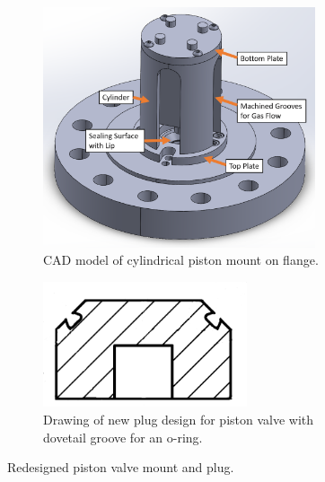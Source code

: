 \begin{figure}[tb]
    \centering
    \begin{subfigure}[t]{0.45\textwidth}
        \centering
        \includegraphics[width=0.88\textwidth]{design/photos/piston_mount_gen2_cad_labels.png}
        \caption{CAD model of cylindrical piston mount on flange.}
        \label{fig:cad mount 2}
    \end{subfigure}
    \hfill
    \begin{subfigure}[t]{0.45\textwidth}
        \centering
        \includegraphics[width=0.66\textwidth]{design/photos/new_plug_draw_crop_paint.png}
        \caption{Drawing of new plug design for piston valve with dovetail groove for an o-ring.}
        \label{fig:plug v2 draw}
    \end{subfigure}
    
    \caption{Redesigned piston valve mount and plug.}
    \label{fig:redesign}
\end{figure}


